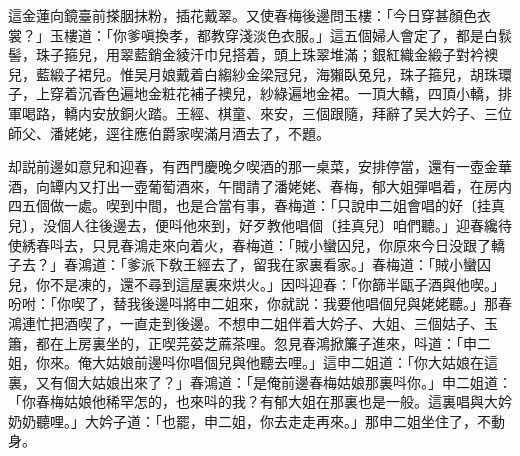 這金蓮向鏡臺前搽胭抹粉，插花戴翠。又使春梅後邊問玉樓：「今日穿甚顏色衣裳？」玉樓道：「你爹嗔換孝，都教穿淺淡色衣服。」這五個婦人會定了，都是白䯼髻，珠子箍兒，用翠藍銷金綾汗巾兒搭着，頭上珠翠堆滿；銀紅織金緞子對衿襖兒，藍緞子裙兒。惟吴月娘戴着白縐紗金梁冠兒，海獺臥兔兒，珠子箍兒，胡珠環子，上穿着沉香色遍地金粧花補子襖兒，紗綠遍地金裙。一頂大轎，四頂小轎，排軍喝路，轎内安放銅火踏。王經、棋童、來安，三個跟隨，拜辭了吴大妗子、三位師父、潘姥姥，逕往應伯爵家喫滿月酒去了，不題。

却説前邊如意兒和迎春，有西門慶晚夕喫酒的那一桌菜，安排停當，還有一壺金華酒，向罈内又打出一壺葡萄酒來，午間請了潘姥姥、春梅，郁大姐彈唱着，在房内四五個做一處。喫到中間，也是合當有事，春梅道：「只說申二姐會唱的好〔挂真兒〕，没個人往後邊去，便呌他來到，好歹教他唱個〔挂真兒〕咱們聽。」迎春纔待使綉春呌去，只見春鴻走來向着火，春梅道：「賊小蠻囚兒，你原來今日没跟了轎子去？」春鴻道：「爹派下敎王經去了，留我在家裏看家。」春梅道：「賊小蠻囚兒，你不是凍的，還不尋到這屋裏來烘火。」因呌迎春：「你篩半甌子酒與他喫。」吩咐：「你喫了，替我後邊呌將申二姐來，你就説：我要他唱個兒與姥姥聽。」那春鴻連忙把酒喫了，一直走到後邊。不想申二姐伴着大妗子、大姐、三個姑子、玉簫，都在上房裏坐的，正喫芫荽芝蔴茶哩。忽見春鴻掀簾子進來，呌道：「申二姐，你來。俺大姑娘前邊呌你唱個兒與他聽去哩。」這申二姐道：「你大姑娘在這裏，又有個大姑娘出來了？」春鴻道：「是俺前邊春梅姑娘那裏呌你。」申二姐道：「你春梅姑娘他稀罕怎的，也來呌的我？有郁大姐在那裏也是一般。這裏唱與大妗奶奶聽哩。」大妗子道：「也罷，申二姐，你去走走再來。」那申二姐坐住了，不動身。

